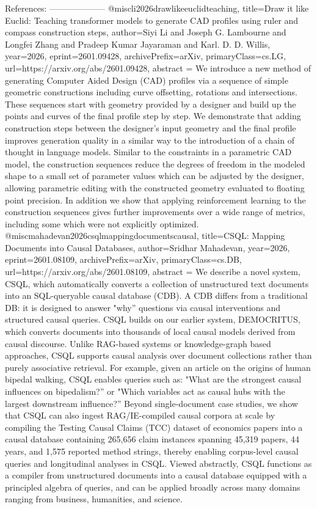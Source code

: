         References:
        --------------------
        @misc{li2026drawlikeeuclidteaching,
      title={Draw it like Euclid: Teaching transformer models to generate CAD profiles using ruler and compass construction steps}, 
      author={Siyi Li and Joseph G. Lambourne and Longfei Zhang and Pradeep Kumar Jayaraman and Karl. D. D. Willis},
      year={2026},
      eprint={2601.09428},
      archivePrefix={arXiv},
      primaryClass={cs.LG},
      url={https://arxiv.org/abs/2601.09428},
      abstract = {We introduce a new method of generating Computer Aided Design (CAD) profiles via a sequence of simple geometric constructions including curve offsetting, rotations and intersections. These sequences start with geometry provided by a designer and build up the points and curves of the final profile step by step. We demonstrate that adding construction steps between the designer's input geometry and the final profile improves generation quality in a similar way to the introduction of a chain of thought in language models. Similar to the constraints in a parametric CAD model, the construction sequences reduce the degrees of freedom in the modeled shape to a small set of parameter values which can be adjusted by the designer, allowing parametric editing with the constructed geometry evaluated to floating point precision. In addition we show that applying reinforcement learning to the construction sequences gives further improvements over a wide range of metrics, including some which were not explicitly optimized.}
}@misc{mahadevan2026csqlmappingdocumentscausal,
      title={CSQL: Mapping Documents into Causal Databases}, 
      author={Sridhar Mahadevan},
      year={2026},
      eprint={2601.08109},
      archivePrefix={arXiv},
      primaryClass={cs.DB},
      url={https://arxiv.org/abs/2601.08109},
      abstract = {We describe a novel system, CSQL, which automatically converts a collection of unstructured text documents into an SQL-queryable causal database (CDB). A CDB differs from a traditional DB: it is designed to answer "why'' questions via causal interventions and structured causal queries. CSQL builds on our earlier system, DEMOCRITUS, which converts documents into thousands of local causal models derived from causal discourse. Unlike RAG-based systems or knowledge-graph based approaches, CSQL supports causal analysis over document collections rather than purely associative retrieval. For example, given an article on the origins of human bipedal walking, CSQL enables queries such as: "What are the strongest causal influences on bipedalism?'' or "Which variables act as causal hubs with the largest downstream influence?'' Beyond single-document case studies, we show that CSQL can also ingest RAG/IE-compiled causal corpora at scale by compiling the Testing Causal Claims (TCC) dataset of economics papers into a causal database containing 265,656 claim instances spanning 45,319 papers, 44 years, and 1,575 reported method strings, thereby enabling corpus-level causal queries and longitudinal analyses in CSQL. Viewed abstractly, CSQL functions as a compiler from unstructured documents into a causal database equipped with a principled algebra of queries, and can be applied broadly across many domains ranging from business, humanities, and science.}
}
